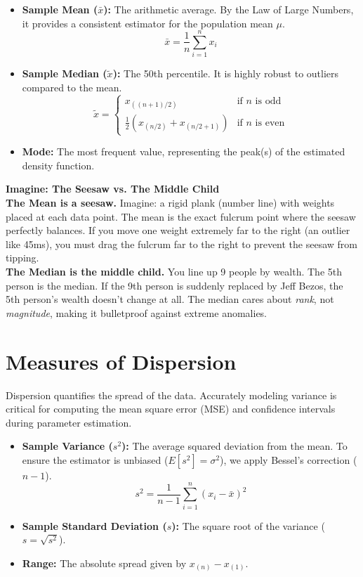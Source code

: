 \documentclass[12pt]{article}
\begin{document}
\begin{itemize}[leftmargin=*]
    \item \textbf{Sample Mean ($\bar{x}$):} The arithmetic average. By the Law of Large Numbers, it provides a consistent estimator for the population mean $\mu$. 
    \[ \bar{x} = \frac{1}{n} \sum_{i=1}^{n} x_i \]
    
    \item \textbf{Sample Median ($\tilde{x}$):} The 50th percentile. It is highly robust to outliers compared to the mean.
    \[ 
    \tilde{x} = 
    \begin{cases} 
    x_{((n+1)/2)} & \text{if } n \text{ is odd} \\
    \frac{1}{2} \left( x_{(n/2)} + x_{(n/2 + 1)} \right) & \text{if } n \text{ is even} 
    \end{cases} 
    \]
    
    \item \textbf{Mode:} The most frequent value, representing the peak(s) of the estimated density function.
\end{itemize}

\vspace{0.5em}
\noindent\textbf{Imagine: The Seesaw vs. The Middle Child}\\
\textbf{The Mean is a seesaw.} Imagine: a rigid plank (number line) with weights placed at each data point. The mean is the exact fulcrum point where the seesaw perfectly balances. If you move one weight extremely far to the right (an outlier like 45ms), you must drag the fulcrum far to the right to prevent the seesaw from tipping. \\
\textbf{The Median is the middle child.} You line up 9 people by wealth. The 5th person is the median. If the 9th person is suddenly replaced by Jeff Bezos, the 5th person's wealth doesn't change at all. The median cares about \textit{rank}, not \textit{magnitude}, making it bulletproof against extreme anomalies.


\section*{Measures of Dispersion}
Dispersion quantifies the spread of the data. Accurately modeling variance is critical for computing the mean square error (MSE) and confidence intervals during parameter estimation.

\begin{itemize}[leftmargin=*]
    \item \textbf{Sample Variance ($s^2$):} The average squared deviation from the mean. To ensure the estimator is unbiased ($E[s^2] = \sigma^2$), we apply Bessel's correction ($n-1$).
    \[ s^2 = \frac{1}{n-1} \sum_{i=1}^{n} (x_i - \bar{x})^2 \]
    
    \item \textbf{Sample Standard Deviation ($s$):} The square root of the variance ($s = \sqrt{s^2}$).
    
    \item \textbf{Range:} The absolute spread given by $x_{(n)} - x_{(1)}$.
\end{itemize}
\end{document}
